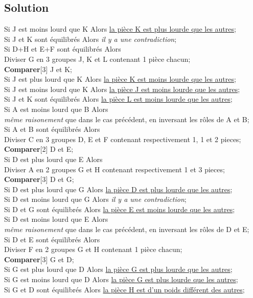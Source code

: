 \documentclass{article}
\newenvironment{solution}{\subsection{Solution}}{\pagebreak}
\begin{document}
\begin{solution}
\begin{tabbing}
\>\> Si J est moins lourd que K Alors \underline{la pièce K est plus lourde que les autres};\\
\>\> Si J et K sont équilibrés Alors {\em il y a une contradiction};\\
\> Si D+H et E+F sont équilibrés Alors\\
\>\> Diviser G en 3 groupes J, K et L contenant 1 pièce chacun;\\
\>\> {\bf Comparer}[3] J et K;\\
\>\> Si J est plus lourd que K Alors \underline{la pièce K est moins lourde que les autres};\\
\>\> Si J est moins lourd que K Alors \underline{la pièce J est moins lourde que les autres};\\
\>\> Si J et K sont équilibrés Alors \underline{la pièce L est moins lourde que les autres};\\
Si A est moins lourd que B Alors\\
\> {\em même raisonement} que dans le cas précédent, en inversant les rôles de A et B;\\
Si A et B sont équilibrés Alors\\
\> Diviser C en 3 groupes D, E et F contenant respectivement 1, 1 et 2 pieces;\\
\> {\bf Comparer}[2] D et E;\\
\> Si D est plus lourd que E Alors\\
\>\> Diviser A en 2 groupes G et H contenant respectivement 1 et 3 pieces;\\
\>\> {\bf Comparer}[3] D et G;\\
\>\> Si D est plus lourd que G Alors \underline{la pièce D est plus lourde que les autres};\\
\>\> Si D est moins lourd que G Alors {\em il y a une contradiction};\\
\>\> Si D et G sont équilibrés Alors \underline{la pièce E est moins lourde que les autres};\\
\> Si D est moins lourd que E Alors\\
\>\> {\em même raisonement} que dans le cas précédent, en inversant les rôles de D et E;\\
\> Si D et E sont équilibrés Alors\\
\>\> Diviser F en 2 groupes G et H contenant 1 pièce chacun;\\
\>\> {\bf Comparer}[3] G et D;\\
\>\> Si G est plus lourd que D Alors \underline{la pièce G est plus lourde que les autres};\\
\>\> Si G est moins lourd que D Alors \underline{la pièce G est plus lourde que les autres};\\
\>\> Si G et D sont équilibrés Alors \underline{la pièce H est d'un poids différent des autres};
\end{tabbing}
\end{solution}
\end{document}
